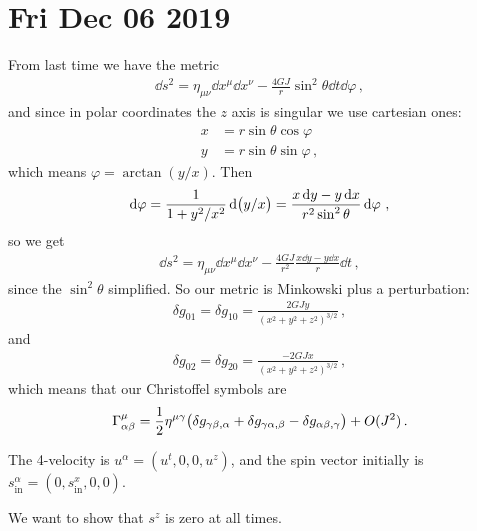 \documentclass[main.tex]{subfiles}
\begin{document}
\section*{Fri Dec 06 2019}

From last time we have the metric 
%
\begin{align}
  \dd{s^2} = \eta_{\mu \nu } \dd{x^{\mu }} \dd{x^{\nu }}  - \frac{4GJ}{r} \sin^2 \theta \dd{t} \dd{\varphi }
\,,
\end{align}
%
and since in polar coordinates the \(z\) axis is singular we use cartesian ones: 
%
\begin{subequations}
\begin{align}
  x &= r \sin \theta \cos \varphi  \\
  y &= r \sin \theta \sin \varphi 
\,,
\end{align}
\end{subequations}
%
which means \(\varphi = \arctan (y/x)\). Then 
%
\begin{align}
  \dd{\varphi } = \frac{1}{1 + y^2 / x^2} \dd{\qty(y/x)}
  = \frac{x \dd{y} - y \dd{x}}{r^2 \sin^2\theta } \dd{\varphi }
\,,
\end{align}
%
so we get 
%
\begin{align}
  \dd{s^2} = \eta_{\mu \nu } \dd{x^{\mu }} \dd{x^{\nu }}  
  - \frac{4GJ}{r^2} \frac{x \dd{y} - y \dd{x}}{r} \dd{t} 
\,,
\end{align}
%
since the \(\sin^2 \theta\) simplified. 
So our metric is Minkowski plus a perturbation: 
%
\begin{align}
  \delta g_{01} = \delta g_{10} = \frac{2GJy}{(x^2+ y^2+z^2)^{3/2}}
\,,
\end{align}
%
and 
%
\begin{align}
    \delta g_{02} = \delta g_{20} = \frac{-2GJx}{(x^2+ y^2+z^2)^{3/2}}
  \,,
\end{align}
%
which means that our Christoffel symbols are 
%
\begin{align}
  \Gamma^{\mu }_{\alpha \beta } = \frac{1}{2} \eta^{\mu \gamma } \qty(\delta g_{\gamma \beta, \alpha } + \delta  g_{\gamma \alpha , \beta } - \delta g_{\alpha \beta , \gamma })
  + O(J^2)
\,.
\end{align}

The 4-velocity is \(u^{ \alpha } = (u^{t}, 0, 0, u^{z})\), and the spin vector initially is \(s^{\alpha } _{\text{in}} = (0, s^{x} _{\text{in}}, 0,0)\).

We want to show that \(s^{z}\) is zero at all times. 
\end{document}
